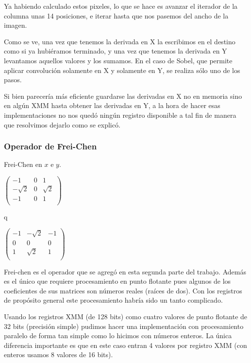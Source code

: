Ya habiendo calculado estos pixeles, lo que se hace es avanzar el iterador de la columna unas 14 posiciones, e iterar hasta que nos pasemos del ancho de la imagen.

Como se ve, una vez que tenemos la derivada en X la escribimos en el destino como
si ya hubiéramos terminado, y una vez que tenemos la derivada en Y levantamos
aquellos valores y los sumamos. En el caso de Sobel, que permite aplicar convolución
solamente en X y solamente en Y, se realiza sólo uno de los pasos.

Si bien parecería más eficiente guardarse las derivadas en X no en memoria sino en
algún XMM hasta obtener las derivadas en Y, a la hora de hacer esas implementaciones
no nos quedó ningún registro disponible a tal fin de manera que resolvimos dejarlo
como se explicó.

\subsubsection{Operador de Frei-Chen}

Frei-Chen en $x$ e $y$.

\begin{center}
\begin{minipage}{0.30 \textwidth}
$\begin{pmatrix}
-1 & 0 & 1 \\
-\sqrt{2} & 0 & \sqrt{2} \\
-1 & 0 & 1 \\
\end{pmatrix}$
\end{minipage}
q\ \ 
 \begin{minipage}{0.30 \textwidth}
$\begin{pmatrix}
-1 & -\sqrt{2} & -1 \\
0 & 0 & 0  \\
1 & \sqrt{2} & 1 \\
\end{pmatrix}$
\end{minipage}
\end{center}

Frei-chen es el operador que se agregó en esta segunda parte del trabajo. Además
es el único que requiere procesamiento en punto flotante pues algunos de los
coeficientes de sus matrices son números reales (raíces de dos).
Con los registros de propósito general este procesamiento habría sido un tanto
complicado.

Usando los registros XMM (de 128 bits) como cuatro valores de punto flotante de 
32 bits (precisión simple) pudimos hacer una implementación con procesamiento 
paralelo de forma tan simple como lo hicimos con números enteros. La única 
diferencia importante es que en este caso entran 4 valores por registro XMM (con
enteros usamos 8 valores de 16 bits).

